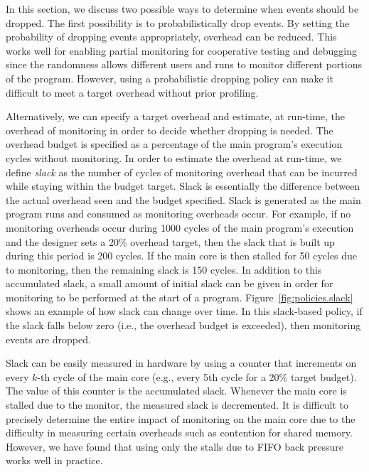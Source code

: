 In this section, we discuss two possible ways to determine when events should
be dropped.  The first possibility is to probabilistically drop events. By
setting the probability of dropping events appropriately, overhead can be
reduced. This works well for enabling partial monitoring for cooperative
testing and debugging since the randomness allows different users and runs to
monitor different portions of the program. However, using a probabilistic
dropping policy can make it difficult to meet a target overhead without prior
profiling.

Alternatively, we can specify a target overhead and estimate, at run-time, the
overhead of monitoring in order to decide whether dropping is needed.  The
overhead budget is specified as a percentage of the main program's execution
cycles without monitoring. In order to estimate the overhead at run-time, we
define \emph{slack} as the number of cycles of monitoring overhead that can be
incurred while staying within the budget target. Slack is essentially the
difference between the actual overhead seen and the budget specified. Slack is
generated as the main program runs and consumed as monitoring overheads occur.
For example, if no monitoring overheads occur during 1000 cycles of the main
program's execution and the designer sets a 20\% overhead target, then the
slack that is built up during this period is 200 cycles. If the main core is
then stalled for 50 cycles due to monitoring, then the remaining slack is 150
cycles.  In addition to this accumulated slack, a small amount of initial slack
can be given in order for monitoring to be performed at the start of a program.
Figure~\ref{fig:policies.slack} shows an example of how slack can change over
time.  In this slack-based policy, if the slack falls below zero (i.e., the
overhead budget is exceeded), then monitoring events are dropped.


Slack can be easily measured in hardware by using a counter that increments on
every $k$-th cycle of the main core (e.g., every 5th cycle for a 20\% target
budget). 
The value of this counter is the accumulated slack. Whenever the main core is
stalled due to the monitor, the measured slack is decremented. It is difficult
to precisely determine the entire impact of monitoring on the main core due to
the difficulty in measuring certain overheads such as contention for shared
memory.  However, we have found that using only the stalls due to FIFO back
pressure works well in practice.

